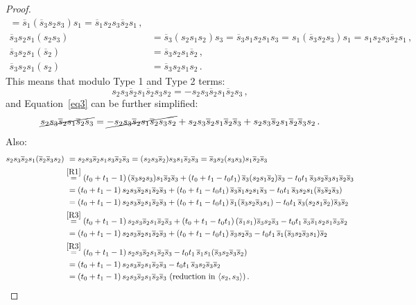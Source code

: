 \documentclass[12pt,reqno]{amsart}
\theoremstyle{definition}
\def\la{\langle}
\def\ra{\rangle}
\def\hs{\overline{s}}
\begin{document}
\begin{proof}
\begin{align*}
= \hs_1 (\hs_3 s_2 s_3) s_1 = \hs_1 s_2 s_3 \hs_2 s_1 \,,
\\
\hs_3 s_2 s_1 (s_2 s_3)  & = \hs_3 (s_2 s_1 s_2) s_3 = \hs_3 s_1 s_2 s_1 s_3
= s_1 (\hs_3 s_2 s_3) s_1 = s_1 s_2 s_3 \hs_2 s_1 \,,
\\
\hs_3 s_2 s_1 (\hs_2)  & = \hs_3 s_2 s_1 \hs_2 \,,
\\
\hs_3 s_2 s_1 (s_2)  & = \hs_3 s_2 s_1 s_2 \,.
\end{align*}
This means that modulo Type 1 and Type 2 terms:
$$
s_2 s_3 \hs_2 s_1 \hs_2 s_3 s_2    =  - s_2 s_3 \hs_2 s_1 \hs_2 s_3  \,,
$$
and Equation~\eqref{eq3} can be further simplified:
$$
\cancel{s_2 s_3 \hs_2 s_1 \hs_2 s_3}   =  \cancel{- s_2 s_3
  \hs_2 s_1 \hs_2 s_3 s_2} + s_2 s_3 \hs_2 s_1 \hs_2 \hs_3
+ s_2 s_3 \hs_2 s_1 \hs_2 \hs_3 s_2 \,.
$$
Also:
\begin{align*}
  s_2 s_3 \hs_2 s_1 (\hs_2 \hs_3 s_2)&\phantom{i}   = s_2 s_3 \hs_2 s_1 s_3
  \hs_2 \hs_3 = (s_2 s_3 \hs_2) s_3 s_1 \hs_2 \hs_3 = \hs_3 s_2 (s_3 s_3) s_1
  \hs_2 \hs_3\\
  & \overset{\eqref{R1}}{=} (t_0 + t_1 - 1) \, (\hs_3 s_2 s_3) s_1 \hs_2 \hs_3
  + (t_0 + t_1 - t_0 t_1 )\, \hs_3 (s_2 s_1 \hs_2) \hs_3 - t_0 t_1 \,
  \hs_3 s_2 \hs_3 s_1 \hs_2 \hs_3\\
  &\phantom{i}  = (t_0 + t_1 - 1) \, s_2 s_3 \hs_2 s_1 \hs_2 \hs_3 + (t_0 + t_1
  - t_0 t_1 )\, \hs_3 \hs_1 s_2 s_1 \hs_3 - t_0 t_1 \, \hs_3 s_2 s_1 (\hs_3
  \hs_2 \hs_3) \\
  & \phantom{i}  = (t_0 + t_1 - 1) \, s_2 s_3 \hs_2 s_1 \hs_2 \hs_3
  + (t_0 + t_1 - t_0 t_1 )\, \hs_1 (\hs_3 s_2 \hs_3 s_1) - t_0 t_1 \,
  \hs_3 (s_2 s_1 \hs_2) \hs_3 \hs_2 \\
  & \overset{\eqref{R3}}{=} (t_0 + t_1 - 1) \, s_2 s_3 \hs_2 s_1 \hs_2 \hs_3
  + (t_0 + t_1 - t_0 t_1 )\, (\hs_1 s_1) \hs_3 s_2 \hs_3 - t_0 t_1 \, \hs_3
  \hs_1 s_2 s_1 \hs_3 \hs_2 \\
  & \phantom{i}  = (t_0 + t_1 - 1) \, s_2 s_3 \hs_2 s_1 \hs_2 \hs_3
  + (t_0 + t_1 - t_0 t_1 )\, \hs_3 s_2 \hs_3 - t_0 t_1 \, \hs_1
  (\hs_3 s_2 \hs_3 s_1) \hs_2 \\
  & \overset{\eqref{R3}}{=} (t_0 + t_1 - 1) \, s_2 s_3 \hs_2 s_1 \hs_2
  \hs_3 - t_0 t_1 \, \hs_1 s_1 (\hs_3 s_2 \hs_3 \hs_2) \\
  & \phantom{i}  = (t_0 + t_1 - 1) \, s_2 s_3 \hs_2 s_1 \hs_2 \hs_3
  - t_0 t_1 \, \hs_3 s_2 \hs_3 \hs_2 \\
  & \phantom{i}  = (t_0 + t_1 - 1) \, s_2 s_3 \hs_2 s_1 \hs_2 \hs_3
  \text{ (reduction in $\la s_2,s_3\ra$)}\,.
\end{align*}

\end{proof}
\end{document}
